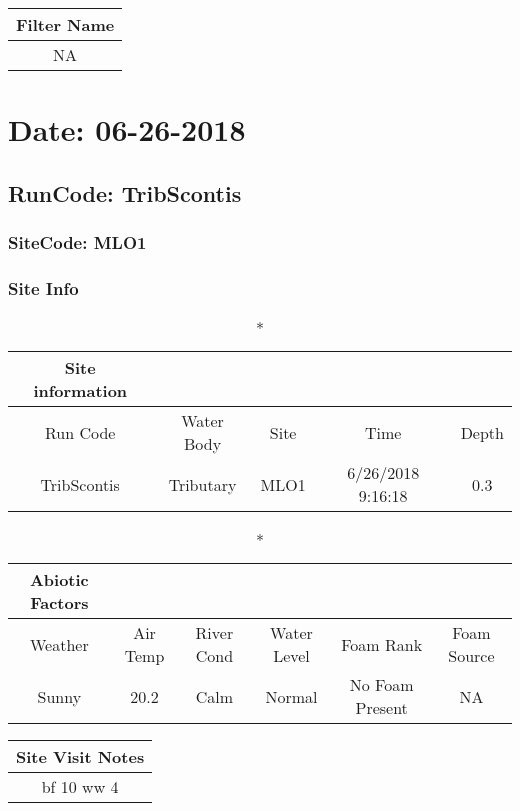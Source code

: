 \documentclass[
  letterpaper,
  DIV=11,
  numbers=noendperiod]{scrartcl}
\begin{document}
\begin{longtable*}{c}
\toprule
Filter Name \\ 
\midrule\addlinespace[2.5pt]
NA \\ 
\bottomrule
\end{longtable*}

\hypertarget{date-06-26-2018-7}{%
\section{Date: 06-26-2018}\label{date-06-26-2018-7}}

\hypertarget{runcode-tribscontis-7}{%
\subsection{RunCode: TribScontis}\label{runcode-tribscontis-7}}

\hypertarget{sitecode-mlo1}{%
\subsubsection{SiteCode: MLO1}\label{sitecode-mlo1}}

\subsubsection{Site Info}

\begin{longtable*}{ccccc}
\caption*{
{\large Site information}
} \\ 
\toprule
Run Code & Water Body & Site & Time & Depth \\ 
\midrule\addlinespace[2.5pt]
TribScontis & Tributary & MLO1 & 6/26/2018 9:16:18 & 0.3 \\ 
\bottomrule
\end{longtable*}

\begin{longtable*}{cccccc}
\caption*{
{\large Abiotic Factors}
} \\ 
\toprule
Weather & Air Temp & River Cond & Water Level & Foam Rank & Foam Source \\ 
\midrule\addlinespace[2.5pt]
Sunny & 20.2 & Calm & Normal & No Foam Present & NA \\ 
\bottomrule
\end{longtable*}

\begin{longtable*}{c}
\toprule
Site Visit Notes \\ 
\midrule\addlinespace[2.5pt]
bf 10
ww 4 \\ 
\bottomrule
\end{longtable*}
\end{document}
